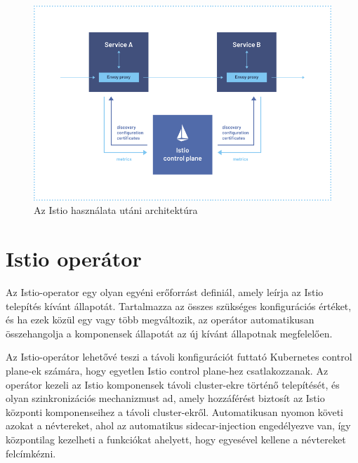 \begin{figure}[ht]
    \centering
         \includegraphics[width=1.0\textwidth]{figures/istio/service-mesh.png}
          \caption{Az Istio használata utáni architektúra \cite{istioSM}}
           \label{service-mesh}
\end{figure}

\section{Istio operátor}
Az Istio-operator egy olyan egyéni erőforrást definiál, amely leírja az Istio telepítés kívánt állapotát. Tartalmazza az összes szükséges konfigurációs értéket, és ha ezek közül egy vagy több megváltozik, az operátor automatikusan összehangolja a komponensek állapotát az új kívánt állapotnak megfelelően.

Az Istio-operátor lehetővé teszi a távoli konfigurációt futtató Kubernetes control plane-ek számára, hogy egyetlen Istio control plane-hez csatlakozzanak. Az operátor kezeli az Istio komponensek távoli cluster-ekre történő telepítését, és olyan szinkronizációs mechanizmust ad, amely hozzáférést biztosít az Istio központi komponenseihez a távoli cluster-ekről. Automatikusan nyomon követi azokat a névtereket, ahol az automatikus sidecar-injection engedélyezve van, így központilag kezelheti a funkciókat ahelyett, hogy egyesével kellene a névtereket felcímkézni.
\cite{banzaicloudOp}

